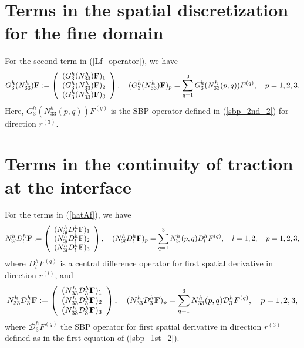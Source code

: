 \section{Terms in the spatial discretization for the fine domain}\label{appendix_fdomain}
For the second term in (\ref{Lf_operator}), we have
\begin{align*}
{{G}}_3^{h}({N}_{33}^{h}){\bf F} := \left(\begin{array}{c}
({{G}}_3^{h}({N}_{33}^{h}){\bf F})_1 \\
({{G}}_3^{h}({N}_{33}^{h}){\bf F})_2 \\
({{G}}_3^{h}({N}_{33}^{h}){\bf F})_3 
\end{array}\right), \quad ({{G}}_3^{h}({N}_{33}^{h}){\bf F})_p = \sum_{q = 1}^{3} {G}_3^{h}(N_{33}^{h}(p,q)) {F}^{(q)},\quad p = 1,2,3.
\end{align*}
Here, ${G}_3^{h}(N_{33}^{h}(p,q)) {F}^{(q)}$ is the SBP operator defined in (\ref{sbp_2nd_2}) for direction $r^{(3)}$. 

\section{Terms in the continuity of traction at the interface}\label{traction_f}
For the terms in (\ref{hatAf}), we have
\begin{align}\label{gamma_D} 
{N}_{3l}^hD_l^h{\bf F} := \left(\begin{array}{c}
({N}_{3l}^hD_l^h{\bf F})_1 \\
({N}_{3l}^hD_l^h{\bf F})_2 \\
({N}_{3l}^hD_l^h{\bf F})_3 
\end{array}\right), \quad ({N}_{3l}^hD_l^h{\bf F})_p = \sum_{q = 1}^{3} N_{3l}^h(p,q)D_l^h{F}^{(q)},\quad l = 1,2, \quad p = 1,2,3,
\end{align}
where $D_l^h{F}^{(q)}$ is a central difference operator for first spatial derivative in direction $r^{(l)}$, and
\begin{align*}
{N}_{33}^h\mathcal{D}_3^h{\bf F} := \left(\begin{array}{c}
({N}_{33}^h\mathcal{D}_3^h{\bf F})_1 \\
({N}_{33}^h\mathcal{D}_3^h{\bf F})_2 \\
({N}_{33}^h\mathcal{D}_3^h{\bf F})_3 
\end{array}\right), \quad ({N}_{33}^h\mathcal{D}_3^h{\bf F})_p = \sum_{q = 1}^{3} N_{33}^h(p,q)\mathcal{D}_3^h{F}^{(q)},\quad p = 1,2,3,
\end{align*}
where $\mathcal{D}_3^h{F}^{(q)}$ the SBP operator for first spatial derivative in direction $r^{(3)}$ defined as in the first equation of (\ref{sbp_1st_2}).

